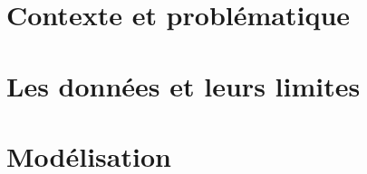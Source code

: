 \documentclass[11pt,a4paper]{report}
\begin{document}





\part{Contexte et problématique}
\label{part:contexte}

\part{Les données et leurs limites}
\label{part:donnees}

\part{Modélisation}
\label{part:modele}
\end{document}
